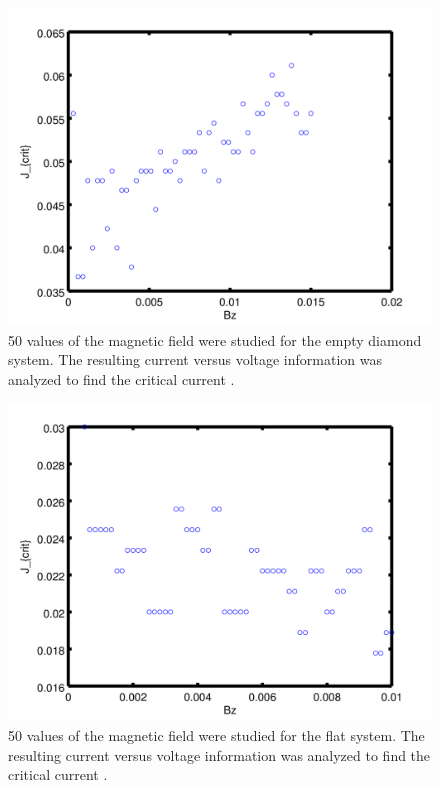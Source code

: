 \begin{figure}[htbp]
\begin{center}
\includegraphics[scale=.50]{emptyDiamondBz.png}
\caption{ 50 values of the magnetic field were studied for the empty diamond system. The resulting current versus voltage information was analyzed to find the critical current .  }
\label{emptyBz}
\end{center}
\end{figure}

\begin{figure}[htbp]
\begin{center}
\includegraphics[scale=.50]{2DFlatBz.png}
\caption{ 50 values of the magnetic field were studied for the flat system. The resulting current versus voltage information was analyzed to find the critical current .  }
\label{flatBz}
\end{center}
\end{figure}

